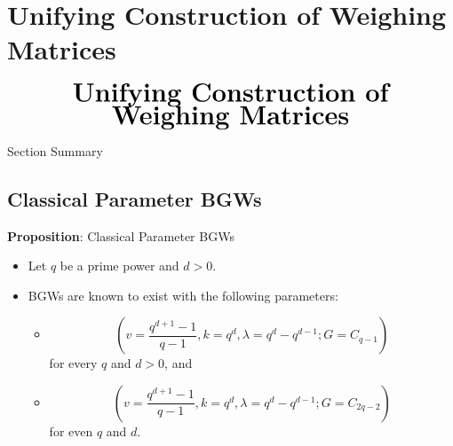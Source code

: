 \documentclass{beamer}
\begin{document}

\section{Unifying Construction of Weighing Matrices}

\begin{frame}
  \[
    \begin{array}{c}
      \text{\huge\bf Unifying Construction of}
      \\
      \text{\huge\bf Weighing Matrices}
    \end{array}
  \]
\end{frame}

\begin{frame}{Section Summary}
  \tableofcontents[sections={3}]
\end{frame}


\subsection{Classical Parameter BGWs}

\begin{frame}

  \begin{block}{{\bf Proposition}: Classical Parameter BGWs}
    \begin{itemize}
    \item Let $q$ be a prime power and $d>0$.
    \item BGWs are known to exist with the following parameters:
      \begin{itemize}
      \item
        \[
          \left(
            v = \frac{q^{d+1}-1}{q-1}, k = q^d, \lambda = q^d-q^{d-1}; G = C_{q-1}
          \right)
        \]
        for every $q$ and $d>0$, and
      \item
        \[
          \left(
            v = \frac{q^{d+1}-1}{q-1}, k = q^d, \lambda = q^d-q^{d-1}; G = C_{2q-2}
          \right)
        \]
        for even $q$ and $d$.
      \end{itemize}
    \end{itemize}
  \end{block}
  
\end{frame}
\end{document}
